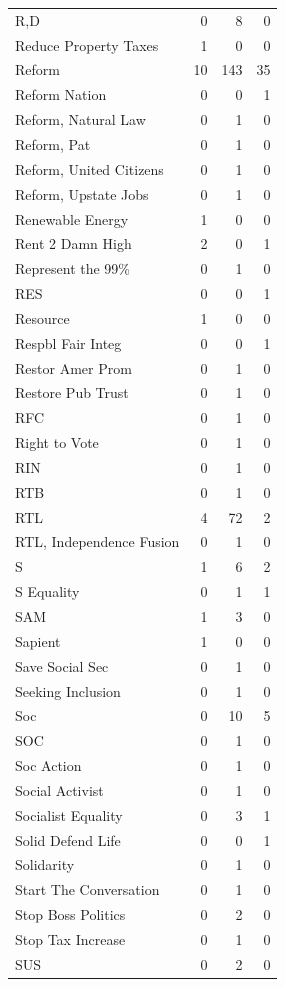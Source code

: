 \begin{supertabular}{lrrr}
R,D & 0 & 8 & 0\\
Reduce Property Taxes & 1 & 0 & 0\\
Reform & 10 & 143 & 35\\
Reform Nation & 0 & 0 & 1\\
Reform, Natural Law & 0 & 1 & 0\\
Reform, Pat & 0 & 1 & 0\\
Reform, United Citizens & 0 & 1 & 0\\
Reform, Upstate Jobs & 0 & 1 & 0\\
Renewable Energy & 1 & 0 & 0\\
Rent 2 Damn High & 2 & 0 & 1\\
Represent the 99\% & 0 & 1 & 0\\
RES & 0 & 0 & 1\\
Resource & 1 & 0 & 0\\
Respbl Fair Integ & 0 & 0 & 1\\
Restor Amer Prom & 0 & 1 & 0\\
Restore Pub Trust & 0 & 1 & 0\\
RFC & 0 & 1 & 0\\
Right to Vote & 0 & 1 & 0\\
RIN & 0 & 1 & 0\\
RTB & 0 & 1 & 0\\
RTL & 4 & 72 & 2\\
RTL, Independence Fusion & 0 & 1 & 0\\
S & 1 & 6 & 2\\
S Equality & 0 & 1 & 1\\
SAM & 1 & 3 & 0\\
Sapient & 1 & 0 & 0\\
Save Social Sec & 0 & 1 & 0\\
Seeking Inclusion & 0 & 1 & 0\\
Soc & 0 & 10 & 5\\
SOC & 0 & 1 & 0\\
Soc Action & 0 & 1 & 0\\
Social Activist & 0 & 1 & 0\\
Socialist Equality & 0 & 3 & 1\\
Solid Defend Life & 0 & 0 & 1\\
Solidarity & 0 & 1 & 0\\
Start The Conversation & 0 & 1 & 0\\
Stop Boss Politics & 0 & 2 & 0\\
Stop Tax Increase & 0 & 1 & 0\\
SUS & 0 & 2 & 0\\

\end{supertabular}
